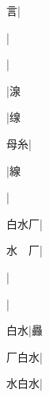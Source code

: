 \begin{multicols}{2}
{{\cjk{}{\cnsym{}　}{\cnsym{}　}言}|{}\par
{}|{}\par
{}|{}\par
{}|{\cjk{}湶}\par
{}|{\cjk{}缐}\par
{母糸}|{}\par
{}|{\cjk{}線}\par
{}|{}\par
{\cjk{}白水厂}|{}\par
{\cjk{}水{\cnsym{}　}厂}|{}\par
{\cjk{}{\cnsym{}　}{\cnsym{}　}{\cnsym{}　}}|{}\par
{\cjk{}{\cnsym{}　}{\cnsym{}　}{\cnsym{}　}}|{}\par
{\cjk{}{\cnsym{}　}白水}|{\cjk{}灥}\par
{\cjk{}厂白水}|{}\par
{\cjk{}水白水}|{}\par
}
\end{multicols}
